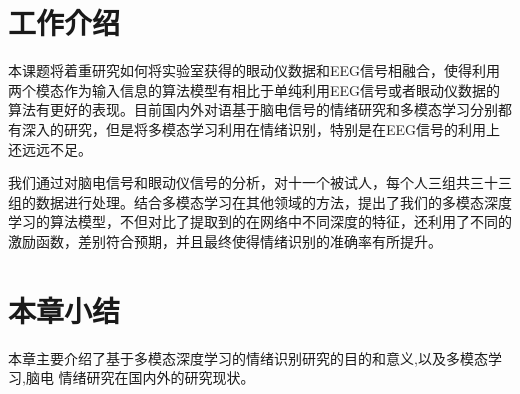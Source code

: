 	 
\section{工作介绍}
	本课题将着重研究如何将实验室获得的眼动仪数据和EEG信号相融合，使得利用两个模态作为输入信息的算法模型有相比于单纯利用EEG信号或者眼动仪数据的算法有更好的表现。目前国内外对语基于脑电信号的情绪研究和多模态学习分别都有深入的研究，但是将多模态学习利用在情绪识别，特别是在EEG信号的利用上还远远不足。
		
	我们通过对脑电信号和眼动仪信号的分析，对十一个被试人，每个人三组共三十三组的数据进行处理。结合多模态学习在其他领域的方法，提出了我们的多模态深度学习的算法模型，不但对比了提取到的在网络中不同深度的特征，还利用了不同的激励函数，差别符合预期，并且最终使得情绪识别的准确率有所提升。
\section{本章小结}
	本章主要介绍了基于多模态深度学习的情绪识别研究的目的和意义,以及多模态学习,脑电 情绪研究在国内外的研究现状。